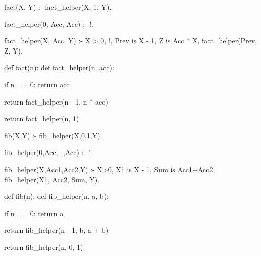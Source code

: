 \noindent
\begin{minipage}[t]{0.485\textwidth}
\begin{codeblocktitle}[title=\textbf{Prolog}]
fact(X, Y) :-
    fact_helper(X, 1, Y).

fact_helper(0, Acc, Acc) :- !.

fact_helper(X, Acc, Y) :- 
    X > 0, !,
    Prev is X - 1, 
    Z is Acc * X, 
    fact_helper(Prev, Z, Y).
\end{codeblocktitle}
\end{minipage}\hfill
\begin{minipage}[t]{0.485\textwidth}
\begin{codeblocktitle}[title=\textbf{Python Equivalent}]
def fact(n):
    def fact_helper(n, acc):

        if n == 0:
            return acc

        return fact_helper(n - 1, n * acc)
        
    return fact_helper(n, 1)
\end{codeblocktitle}
\end{minipage}

\noindent
\begin{minipage}[t]{0.485\textwidth}
\begin{codeblocktitle}[title=\textbf{Prolog}]
fib(X,Y) :- 
    fib_helper(X,0,1,Y).

fib_helper(0,Acc,_,Acc) :- !.

fib_helper(X,Acc1,Acc2,Y) :-
    X>0,
    X1 is X - 1,
    Sum is Acc1+Acc2,
    fib_helper(X1, Acc2, Sum, Y).
\end{codeblocktitle}
\end{minipage}\hfill
\begin{minipage}[t]{0.485\textwidth}
\begin{codeblocktitle}[title=\textbf{Python Equivalent}]
def fib(n):
    def fib_helper(n, a, b):

        if n == 0:
            return a

        return fib_helper(n - 1, b, a + b)

    return fib_helper(n, 0, 1)
\end{codeblocktitle}
\end{minipage}

